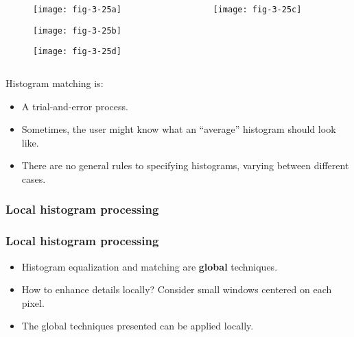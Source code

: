 
\begin{frame}
\begin{columns}
\begin{column}{.5\textwidth}
\begin{figure}
\centering
\texttt{[image: fig-3-25a]}
\end{figure}
\begin{figure}
\centering
\texttt{[image: fig-3-25b]}
\end{figure}
\begin{figure}
\centering
\texttt{[image: fig-3-25d]}
\end{figure}
\end{column}
\begin{column}{.5\textwidth}
\begin{figure}
\centering
\texttt{[image: fig-3-25c]}
\end{figure}
\end{column}
\end{columns}
\end{frame}


\begin{frame}
Histogram matching is:
\begin{itemize}
\item A trial-and-error process.
\item Sometimes, the user might know what an ``average'' histogram should look like.
\item There are no general rules to specifying histograms, varying between different cases.
\end{itemize}
\end{frame}


\subsubsection{Local histogram processing}


\begin{frame}
\frametitle{Local histogram processing}
\begin{itemize}
\item Histogram equalization and matching are \textbf{global} techniques.
\item How to enhance details locally? Consider small windows centered on each pixel.
\item The global techniques presented can be applied locally.
\end{itemize}
\end{frame}

